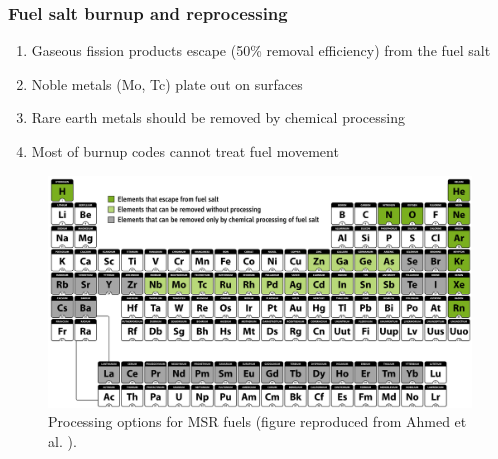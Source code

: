 \begin{frame}
\frametitle{Fuel salt burnup and reprocessing}
\vspace*{-0.05in}
\begin{enumerate}
	\item Gaseous fission products escape (50\% removal efficiency) from the fuel salt
	\item Noble metals (Mo, Tc) plate out on surfaces
	\item Rare earth metals should be removed by chemical processing
	\item Most of burnup codes cannot treat fuel movement
\end{enumerate}

\begin{figure}[t]
	\hspace*{-0.2in}
	\includegraphics[height=0.48\textwidth]{../figures/periodic_map.png}
	\vspace*{-0.05in}
	\caption{Processing options for MSR fuels (figure reproduced from Ahmed et al. \cite{ahmad_neutronics_2015}).}
\end{figure}               
\end{frame}


